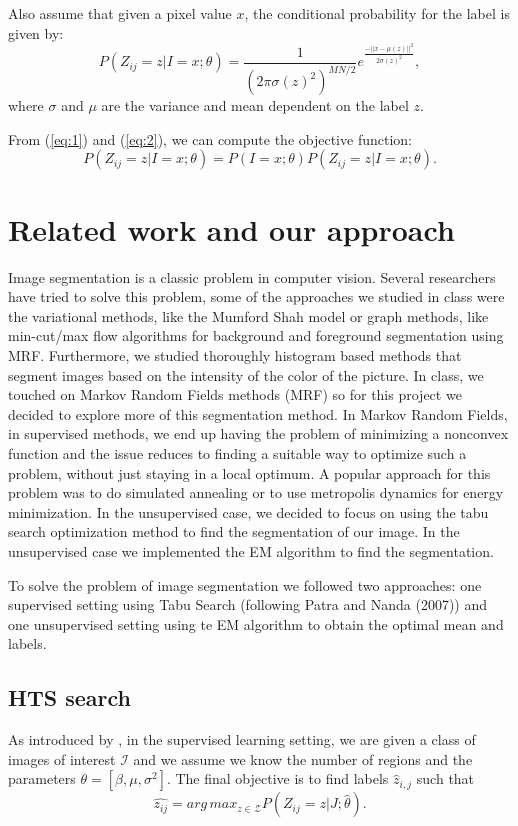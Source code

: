 \documentclass[twoside,10.5pt]{article}
\newcommand{\argmax}{arg\,max}
\begin{document}
Also assume that given a pixel value $x$, the conditional probability for the label is given by:
\begin{equation} \label{eq:2}
P(Z_{ij}=z|I=x; \theta) = \frac{1}{(2\pi \sigma(z)^2)^{MN/2}}e^{\frac{-||x-\mu(z)||^2}{2\sigma(z)^2}},
\end{equation}
where $\sigma$ and $\mu$ are the variance and mean dependent on the label $z$.

From (\ref{eq:1}) and (\ref{eq:2}), we can compute the objective function:
\begin{equation}
P(Z_{ij}=z|I = x; \theta) = P(I=x;\theta) P(Z_{ij}=z|I=x; \theta).
\end{equation}

\section{Related work and our approach}

Image segmentation is a classic problem in computer vision. Several researchers have tried to solve this problem, some of the approaches we studied in class were the variational methods, like the Mumford Shah model or graph methods, like min-cut/max flow algorithms for background and foreground segmentation using MRF. Furthermore, we studied thoroughly histogram based methods that segment images based on the intensity of the color of the picture. In class, we touched on Markov Random Fields methods (MRF) so for this project we decided to explore more of this segmentation method. In Markov Random Fields, in supervised methods, we end up having the problem of minimizing a nonconvex function and the issue reduces to finding a suitable way to optimize such a problem, without just staying in a local optimum. A  popular approach for this problem was to do simulated annealing or to use metropolis dynamics for energy minimization. In the unsupervised case, we decided to focus on using the tabu search optimization method to find the segmentation of our image. In the unsupervised case we implemented the EM algorithm to find the segmentation. 

To solve the problem of image segmentation we followed two approaches: one supervised setting using Tabu Search (following Patra and Nanda (2007)) and one unsupervised setting using te EM algorithm to obtain the optimal mean and labels.

\subsection{HTS search}
As introduced by \citet{Patra:2007:ISU:1335117.1335489}, in the supervised learning setting, we are given a class of images of interest $\mathcal{I}$ and we assume we know the number of regions and the parameters $\theta = [\beta,\mu,\sigma^2]$. The final objective is to find labels $\hat{z}_{i,j}$ such that 
\begin{equation} \label{eq:3}
\hat{z_{ij}}=\argmax_{z \in \mathcal{Z}} P(Z_{ij}=z|J; \hat{\theta}).
\end{equation}
\end{document}

